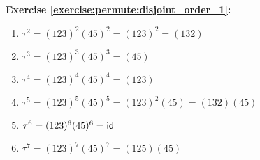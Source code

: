 \noindent\textbf{Exercise \ref{exercise:permute:disjoint_order_1}:}
\begin{enumerate}[{a.}]
\item 
$\tau^2 = (123)^2(45)^2 = (123)^2 = (132)$

\item 
$\tau^3 = (123)^3(45)^3 = (45)$

\item 
$\tau^4 = (123)^4(45)^4 = (123)$

\item 
$\tau^5 = (123)^5(45)^5 = (123)^2(45) = (132)(45)$

\item 
$\tau^6 =  (123)^6(45)^6 = \sf{id}$

\item
$\tau^7 =  (123)^7(45)^7 = (125)(45)$
\end{enumerate}

